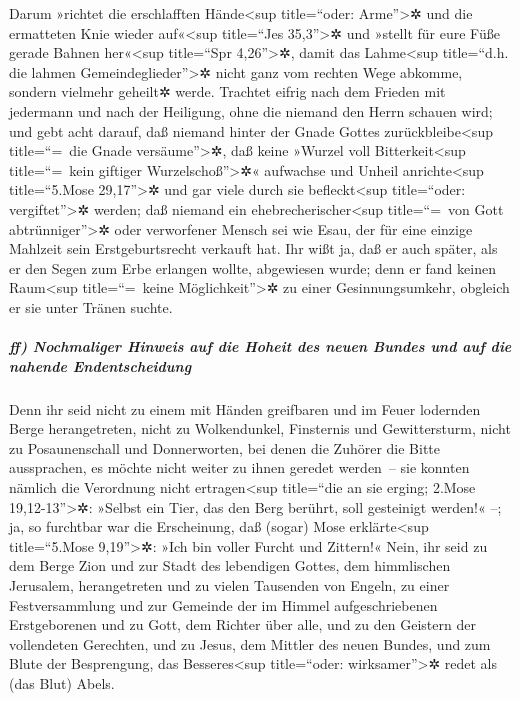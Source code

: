  Darum »richtet die erschlafften Hände\textless sup
title=``oder: Arme''\textgreater✲ und die ermatteten Knie wieder
auf«\textless sup title=``Jes 35,3''\textgreater✲  und
»stellt für eure Füße gerade Bahnen her«\textless sup title=``Spr
4,26''\textgreater✲, damit das Lahme\textless sup title=``d.h. die
lahmen Gemeindeglieder''\textgreater✲ nicht ganz vom rechten Wege
abkomme, sondern vielmehr geheilt✲ werde.  Trachtet
eifrig nach dem Frieden mit jedermann und nach der Heiligung, ohne die
niemand den Herrn schauen wird;  und gebt acht darauf,
daß niemand hinter der Gnade Gottes zurückbleibe\textless sup
title=``=~die Gnade versäume''\textgreater✲, daß keine »Wurzel voll
Bitterkeit\textless sup title=``=~kein giftiger
Wurzelschoß''\textgreater✲« aufwachse und Unheil anrichte\textless sup
title=``5.Mose 29,17''\textgreater✲ und gar viele durch sie
befleckt\textless sup title=``oder: vergiftet''\textgreater✲ werden;
 daß niemand ein ehebrecherischer\textless sup
title=``=~von Gott abtrünniger''\textgreater✲ oder verworfener Mensch
sei wie Esau, der für eine einzige Mahlzeit sein Erstgeburtsrecht
verkauft hat.  Ihr wißt ja, daß er auch später, als er
den Segen zum Erbe erlangen wollte, abgewiesen wurde; denn er fand
keinen Raum\textless sup title=``=~keine Möglichkeit''\textgreater✲ zu
einer Gesinnungsumkehr, obgleich er sie unter Tränen suchte.

\hypertarget{ff-nochmaliger-hinweis-auf-die-hoheit-des-neuen-bundes-und-auf-die-nahende-endentscheidung}{%
\subparagraph{ff) Nochmaliger Hinweis auf die Hoheit des neuen Bundes
und auf die nahende
Endentscheidung}\label{ff-nochmaliger-hinweis-auf-die-hoheit-des-neuen-bundes-und-auf-die-nahende-endentscheidung}}

 Denn ihr seid nicht zu einem mit Händen greifbaren und
im Feuer lodernden Berge herangetreten, nicht zu Wolkendunkel,
Finsternis und Gewittersturm,  nicht zu Posaunenschall
und Donnerworten, bei denen die Zuhörer die Bitte aussprachen, es möchte
nicht weiter zu ihnen geredet werden~--  sie konnten
nämlich die Verordnung nicht ertragen\textless sup title=``die an sie
erging; 2.Mose 19,12-13''\textgreater✲: »Selbst ein Tier, das den Berg
berührt, soll gesteinigt werden!« --;  ja, so furchtbar
war die Erscheinung, daß (sogar) Mose erklärte\textless sup
title=``5.Mose 9,19''\textgreater✲: »Ich bin voller Furcht und Zittern!«
 Nein, ihr seid zu dem Berge Zion und zur Stadt des
lebendigen Gottes, dem himmlischen Jerusalem, herangetreten und zu
vielen Tausenden von Engeln, zu einer Festversammlung 
und zur Gemeinde der im Himmel aufgeschriebenen Erstgeborenen und zu
Gott, dem Richter über alle, und zu den Geistern der vollendeten
Gerechten,  und zu Jesus, dem Mittler des neuen Bundes,
und zum Blute der Besprengung, das Besseres\textless sup title=``oder:
wirksamer''\textgreater✲ redet als (das Blut) Abels.

